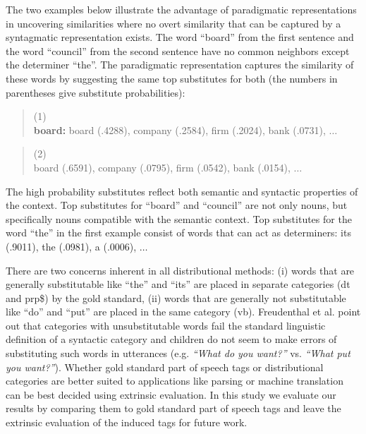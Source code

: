 
The two examples below illustrate the advantage of paradigmatic
representations in uncovering similarities where no overt similarity
that can be captured by a syntagmatic representation exists.  The word
``board'' from the first sentence and the word ``council'' from the
second sentence have no common neighbors except the determiner
``the''.  The paradigmatic representation captures the similarity of
these words by suggesting the same top substitutes for both (the
numbers in parentheses give substitute probabilities):
\begin{quote}
 (1) \\
 {\bf board:} board (.4288), company (.2584), firm (.2024), bank (.0731), $\ldots$
\end{quote}

\begin{quote}
  (2) \\
  board (.6591), company (.0795), firm (.0542), bank (.0154), $\ldots$
\end{quote}

The high probability substitutes reflect both semantic and syntactic
properties of the context.  Top substitutes for ``board'' and
``council'' are not only nouns, but specifically nouns compatible with
the semantic context.  Top substitutes for the word ``the'' in the
first example consist of words that can act as determiners: its
(.9011), the (.0981), a (.0006), $\ldots$

There are two concerns inherent in all distributional methods: (i)
words that are generally substitutable like ``the'' and ``its'' are
placed in separate categories ({\sc dt} and {\sc prp\$}) by the gold
standard, (ii) words that are generally not substitutable like ``do''
and ``put'' are placed in the same category ({\sc vb}).  Freudenthal
et al.  point out that categories
with unsubstitutable words fail the standard linguistic definition of
a syntactic category and children do not seem to make errors of
substituting such words in utterances (e.g. {\em``What do you want?''}
vs. {\em *``What put you want?''}).  Whether gold standard part of
speech tags or distributional categories are better suited to
applications like parsing or machine translation can be best decided
using extrinsic evaluation.  In this study we evaluate our results by
comparing them to gold standard part of speech tags and leave the
extrinsic evaluation of the induced tags for future work.

